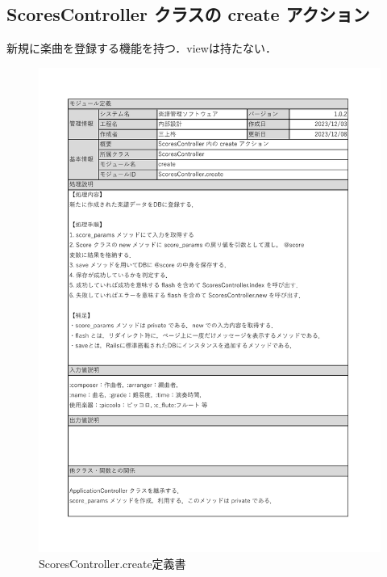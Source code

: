 \subsection*{ScoresController クラスの create アクション}
新規に楽曲を登録する機能を持つ．viewは持たない．
\begin{figure}[H]
    \centering
    \includegraphics[scale=0.6]{img/Scores/xlsx/ScoresController_create.pdf}
    \vspace{-1cm}
    \caption{ScoresController.create定義書}
\end{figure}
